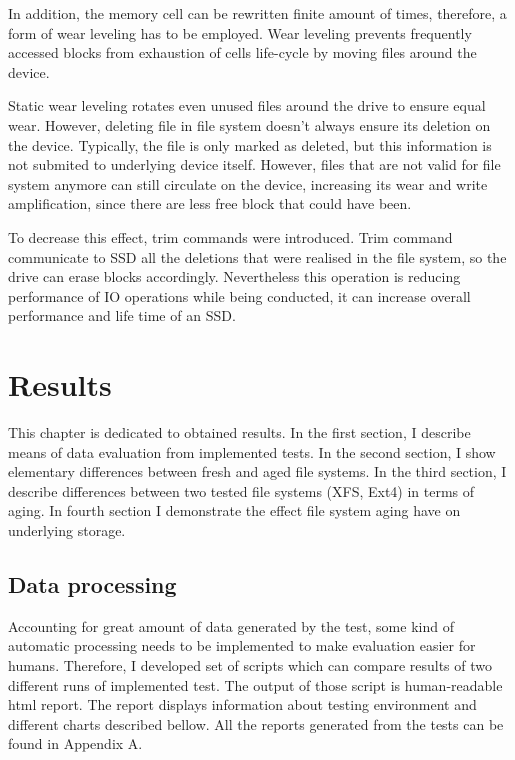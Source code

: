 \documentclass[
  color, %
  table, %
  lof,   %
  lot,   %
]{fithesis3}
\begin{document}
In addition, the memory cell can be rewritten finite amount of times, therefore, a form of wear leveling has to be employed. Wear leveling prevents frequently accessed blocks from exhaustion of cells life-cycle by moving files around the device.

Static wear leveling rotates even unused files around the drive to ensure equal wear. However, deleting file in file system doesn't always ensure its deletion on the device. Typically, the file is only marked as deleted, but this information is not submited to underlying device itself. However, files that are not valid for file system anymore can still circulate on the device, increasing its wear and write amplification, since there are less free block that could have been.

To decrease this effect, trim commands were introduced. Trim command communicate to SSD all the deletions that were realised in the file system, so the drive can erase blocks accordingly. Nevertheless this operation is reducing performance of IO operations while being conducted, it can increase overall performance and life time of an SSD.



\chapter{Results}
This chapter is dedicated to obtained results. In the first section, I describe means of data evaluation from implemented tests. In the second section, I show elementary differences between fresh and aged file systems. In the third section, I describe differences between two tested file systems (XFS, Ext4) in terms of aging. In fourth section I demonstrate the effect file system aging have on underlying storage.

\section{Data processing}
Accounting for great amount of data generated by the test, some kind of automatic processing needs to be implemented to make evaluation easier for humans. Therefore, I developed set of scripts which can compare results of two different runs of implemented test. The output of those script is human-readable html report. The report displays information about testing environment and different charts described bellow. All the reports generated from the tests can be found in Appendix A.
\end{document}
